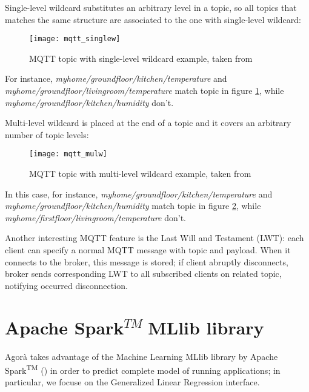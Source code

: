 Single-level wildcard substitutes an arbitrary level in a topic, so all topics that matches the same structure are associated to the one with single-level wildcard:

\begin{figure}[H]

    \centering
    \texttt{[image: mqtt\_singlew]}
    \caption{MQTT topic with single-level wildcard example, taken from \cite{site:hivemq}}
    \label{fig:mqtt_singlew}

\end{figure}

For instance, \textit{myhome\slash{}groundfloor\slash{}kitchen\slash{}temperature} and \textit{myhome\slash{}groundfloor\slash{}livingroom\slash{}temperature} match topic in figure \ref{fig:mqtt_singlew}, while \textit{myhome\slash{}groundfloor\slash{}kitchen\slash{}humidity} don't.

Multi-level wildcard is placed at the end of a topic and it covers an arbitrary number of topic levels:

\begin{figure}[H]

    \centering
    \texttt{[image: mqtt\_mulw]}
    \caption{MQTT topic with multi-level wildcard example, taken from \cite{site:hivemq}}
    \label{fig:mqtt_mulw}

\end{figure}

In this case, for instance, \textit{myhome\slash{}groundfloor\slash{}kitchen\slash{}tem\-per\-a\-ture} and \textit{myhome\slash{}groundfloor\slash{}kitchen\slash{}humidity} match topic in figure \ref{fig:mqtt_mulw}, while \textit{myhome\slash{}firstfloor\slash{}livingroom\slash{}temperature} don't.

Another interesting MQTT feature is the Last Will and Testament (LWT): each client can specify a normal MQTT message with topic and payload. When it connects to the broker, this message is stored; if client abruptly disconnects, broker sends corresponding LWT to all subscribed clients on related topic, notifying occurred disconnection.





\section{Apache Spark\texorpdfstring{$^{TM}\;$}MMLlib library}

Agorà takes advantage of the Machine Learning MLlib library by Apache Spark\textsuperscript{TM} (\cite{spark2015apache}) in order to predict complete model of running applications; in particular, we focuse on the Generalized Linear Regression interface.


